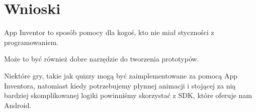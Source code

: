 \chapter{Wnioski}


App Inventor to sposób pomocy dla kogoś, kto nie miał styczności z programowaniem. 

Może to być również dobre narzędzie do tworzenia prototypów.

Niektóre gry, takie jak quizzy mogą być zaimplementowane za pomocą App Inventora, natomiast kiedy potrzebujemy płynnej animacji i stojącej za nią bardziej skomplikowanej logiki powinniśmy skorzystać z SDK, które oferuje nam Android.




